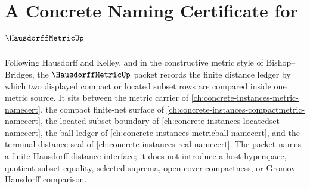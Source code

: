 \chapter{A Concrete Naming Certificate for $\HausdorffMetricUp$}
\label{ch:concrete-instances-hausdorffmetric-namecert}

Following Hausdorff and Kelley, and in the constructive metric style of Bishop--Bridges, the $\HausdorffMetricUp$ packet records the finite distance ledger by which two displayed compact or located subset rows are compared inside one metric source. It sits between the metric carrier of \autoref{ch:concrete-instances-metric-namecert}, the compact finite-net surface of \autoref{ch:concrete-instances-compactmetric-namecert}, the located-subset boundary of \autoref{ch:concrete-instances-locatedset-namecert}, the ball ledger of \autoref{ch:concrete-instances-metricball-namecert}, and the terminal distance seal of \autoref{ch:concrete-instances-real-namecert}. The packet names a finite Hausdorff-distance interface; it does not introduce a host hyperspace, quotient subset equality, selected suprema, open-cover compactness, or Gromov-Hausdorff comparison.

